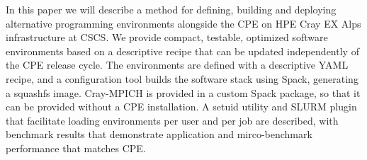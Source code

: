 In this paper we will describe a method for defining, building and deploying alternative programming environments alongside the CPE on HPE Cray EX Alps infrastructure at CSCS.
We provide compact, testable, optimized software environments based on a descriptive recipe that can be updated independently of the CPE release cycle.
The environments are defined with a descriptive YAML recipe, and a configuration tool builds the software stack using Spack, generating a squashfs image.
Cray-MPICH is provided in a custom Spack package, so that it can be provided without a CPE installation.
A setuid utility and SLURM plugin that facilitate loading environments per user and per job are described, with benchmark results that demonstrate application and mirco-benchmark performance that matches CPE.

